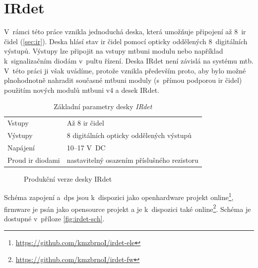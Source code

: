 \newpage
\section{IRdet} \label{sec:irdet}

V~rámci této práce vznikla jednoduchá deska, která umožňuje připojení až 8~\gls{ir}
čidel (\ref{sec:ir}). Deska hlásí stav \gls{ir} čidel pomocí opticky oddělených
8~digitálních výstupů. Výstupy lze připojit na vstupy \gls{mtbuni}
modulu nebo například k~signalizačním diodám v~pultu řízení.
Deska IRdet není závislá na systému \gls{mtb}. V~této práci ji
však uvádíme, protože vznikla především proto, aby bylo možné plnohodnotně
nahradit současné \gls{mtbuni} moduly (s~přímou podporou \gls{ir} čidel) použitím
nových modulů \gls{mtbuni} v4 a desek IRdet.

\begin{table}[ht]
	\begin{tabularx}{\textwidth}{lX}
		\toprule
		Vstupy & Až 8 \gls{ir} čidel \\
		Výstupy & 8 digitálních opticky oddělených výstupů \\
		Napájení & 10–17 V~DC \\
		Proud \gls{ir} diodami & nastavitelný osazením příslušného rezistoru \\
		\bottomrule
	\end{tabularx}
	\caption{Základní parametry desky \textit{IRdet}}
	\label{tab:mtbuni-params}
\end{table}

\begin{figure}[ht!]
\caption{Produkční verze desky IRdet}
\label{fig:irdet}
\end{figure}

Schéma zapojení a~\gls{dps} jsou k~dispozici jako open\-hard\-ware
projekt online\footnote{\url{https://github.com/kmzbrnoI/irdet-ele}}, firmware
je psán jako opensource projekt a je k~dispozici také
online\footnote{\url{https://github.com/kmzbrnoI/irdet-fw}}.
Schéma je dostupné v~příloze \ref{fig:irdet-sch}.

